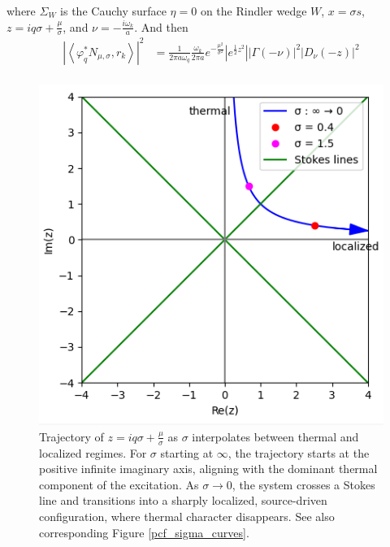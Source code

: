 \documentclass[12pt,a4paper]{article}
\begin{document}
{where $\Sigma_W$ is the Cauchy surface $\eta=0$ on the Rindler wedge $W$,  $x = \sigma s$, $z = i q \sigma + \frac{\mu}{\sigma}$, and $\nu = -\frac{i \omega_k}{a}$. And then
\begin{equation}
  \begin{aligned}
    \left|\left< \varphi^*_q N_{\mu,\sigma}, r_k \right>\right|^2 &= \frac{1}{2\pi a \omega_q} \frac{\omega_k}{2\pi a} e^{-\frac{\mu^2}{\sigma^2}} \left| e^{\frac{1}{2} z^2} \right| \left| \Gamma(-\nu) \right|^2 \left| D_\nu(-z) \right|^2 \\
  \end{aligned}
\label{pcf}
\end{equation}
\begin{figure}[h]
\centering
\includegraphics[scale=0.5]{stokes.png}
\caption{Trajectory of $z = i q \sigma + \frac{\mu}{\sigma}$ as $\sigma$ interpolates between thermal and localized regimes. For $\sigma$ starting at $\infty$, the trajectory starts at the positive infinite imaginary axis, aligning with the dominant thermal component of the excitation. As $\sigma \to 0$, the system crosses a Stokes line and transitions into a sharply localized, source-driven configuration, where thermal character disappears. See also corresponding Figure \ref{pcf_sigma_curves}.}
\label{stokes}
\end{figure}
\begin{figure}
\centering

\end{figure}}
\end{document}
